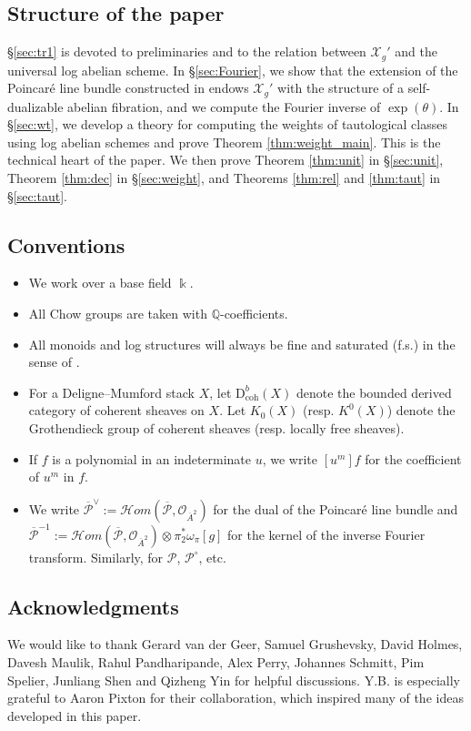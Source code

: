 \documentclass[11pt]{article}
\def\CO{\mathcal{O}}
\def\X{\mathcal{X}}
\def\QQ{\mathbb{Q}}
\def\hom{\mathcal{H}om}
\def\dbcoh{\mathrm{D}^b_{\mathrm{coh}}}
\def\Pbar{\overline{\mathcal{P}}}
\newcommand{\barA}{\overline{A}}
\theoremstyle{definition}
\begin{document}
\subsection{Structure of the paper}

\S\ref{sec:tr1} is devoted to preliminaries and to the relation between $\X_g'$ and the universal log abelian scheme.
In \S\ref{sec:Fourier}, we show that the extension of the Poincar\'e line bundle constructed in \cite{BMP} endows $\X_g'$ with the structure of a self-dualizable abelian fibration, and we compute the Fourier inverse of $\exp(\theta)$.
In \S\ref{sec:wt}, we develop a theory for computing the weights of tautological classes using log abelian schemes and prove Theorem \ref{thm:weight_main}. This is the technical heart of the paper.
We then prove Theorem \ref{thm:unit} in
\S\ref{sec:unit}, Theorem \ref{thm:dec} in \S\ref{sec:weight}, and Theorems \ref{thm:rel} and \ref{thm:taut} in \S\ref{sec:taut}.


\subsection*{Conventions}

\begin{itemize}
	\item We work over a base field $\Bbbk$.
	\item All Chow groups are taken with $\QQ$-coefficients.
	\item All monoids and log structures will always be fine and saturated (f.s.) in the sense of \cite{Kato}.
	\item For a Deligne--Mumford stack $X$, let $\dbcoh(X)$ denote the bounded derived category of coherent sheaves on $X$. Let $K_0(X)$ (resp. $K^0(X)$) denote the Grothendieck group of coherent sheaves (resp. locally free sheaves).
	\item If $f$ is a polynomial in an indeterminate $u$, we write $[u ^{m}]f$ for the coefficient of $u ^{m}$ in $f$.
	\item We write $\Pbar^{\vee}:=\hom(\Pbar,\CO_{\barA^{2}})$ for the dual of the Poincar\'e line bundle and $\Pbar^{-1}:=\hom(\Pbar,\CO_{\barA^2}) \otimes \pi_2^*\omega_\pi [g]$ for the kernel of the inverse Fourier transform. Similarly, for $\mathcal{P}$, $\mathcal{P}^{\circ}$, etc.
\end{itemize}

\subsection*{Acknowledgments}
We would like to thank Gerard van der Geer, Samuel Grushevsky, David Holmes, Davesh Maulik, Rahul Pandharipande, Alex Perry, Johannes Schmitt, Pim Spelier, Junliang Shen and Qizheng Yin for helpful discussions. Y.B. is especially grateful to Aaron Pixton for their collaboration, which inspired many of the ideas developed in this paper.
\end{document}
